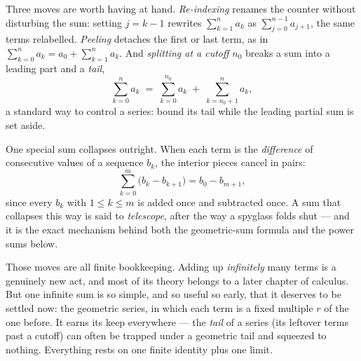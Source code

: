 \documentclass[a4paper,12pt,oneside]{memoir}
\begin{document}
Three moves are worth having at hand. \emph{Re-indexing} renames the counter without disturbing the sum: setting \(j = k - 1\) rewrites \(\sum_{k=1}^{n} a_{k}\) as \(\sum_{j=0}^{n-1} a_{j+1}\), the same terms relabelled. \emph{Peeling} detaches the first or last term, as in \(\sum_{k=0}^{n} a_{k} = a_{0} + \sum_{k=1}^{n} a_{k}\). And \emph{splitting at a cutoff} \(n_{0}\) breaks a sum into a leading part and a \emph{tail}, \[ \sum_{k=0}^{n} a_{k} \;=\; \sum_{k=0}^{n_{0}} a_{k} \;+\; \sum_{k=n_{0}+1}^{n} a_{k}, \] a standard way to control a series: bound its tail while the leading partial sum is set aside.

One special sum collapses outright. When each term is the \emph{difference} of consecutive values of a sequence \(b_{k}\), the interior pieces cancel in pairs: \[ \sum_{k=0}^{m} \bigl(b_{k} - b_{k+1}\bigr) = b_{0} - b_{m+1}, \] since every \(b_{k}\) with \(1 \le k \le m\) is added once and subtracted once. A sum that collapses this way is said to \emph{telescope}, after the way a spyglass folds shut — and it is the exact mechanism behind both the geometric-sum formula and the power sums below.

Those moves are all finite bookkeeping. Adding up \emph{infinitely} many terms is a genuinely new act, and most of its theory belongs to a later chapter of calculus. But one infinite sum is so simple, and so useful so early, that it deserves to be settled now: the geometric series, in which each term is a fixed multiple \(r\) of the one before. It earns its keep everywhere — the \emph{tail} of a series (its leftover terms past a cutoff) can often be trapped under a geometric tail and squeezed to nothing. Everything rests on one finite identity plus one limit.
\end{document}
